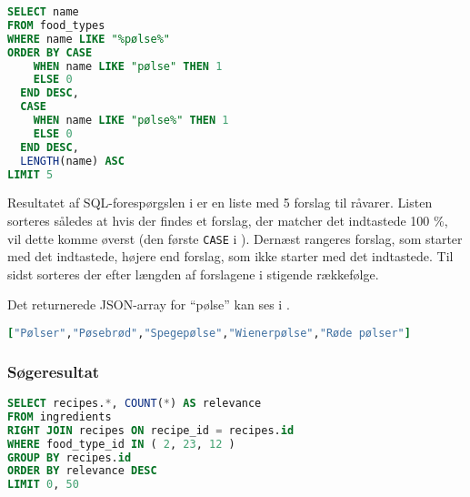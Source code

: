 \begin{lstlisting}[caption={Hvis en bruger indtaster ``pølse'' udføres denne SQL-forespørgsel.},label=lst:soegeforslag-sql,language=SQL]
SELECT name
FROM food_types
WHERE name LIKE "%pølse%"
ORDER BY CASE
    WHEN name LIKE "pølse" THEN 1
    ELSE 0
  END DESC,
  CASE
    WHEN name LIKE "pølse%" THEN 1
    ELSE 0
  END DESC,
  LENGTH(name) ASC
LIMIT 5
\end{lstlisting}

Resultatet af SQL-forespørgslen i  er en liste med 5 forslag til råvarer. Listen sorteres således at hvis der findes et forslag, der matcher det indtastede 100 \%, vil dette komme øverst (den første \texttt{CASE} i ). Dernæst rangeres forslag, som starter med det indtastede, højere end forslag, som ikke starter med det indtastede. Til sidst sorteres der efter længden af forslagene i stigende rækkefølge.

Det returnerede JSON-array for ``pølse'' kan ses i .

\begin{lstlisting}[caption={Et returneret JSON-array for ``pølse''.},label=lst:poelse-json,language=Ruby]
["Pølser","Pøsebrød","Spegepølse","Wienerpølse","Røde pølser"]
\end{lstlisting}

\subsubsection{Søgeresultat}
\begin{lstlisting}[caption={SQL query.},label=lst:soegeforslag-sql,language=SQL]
SELECT recipes.*, COUNT(*) AS relevance
FROM ingredients
RIGHT JOIN recipes ON recipe_id = recipes.id
WHERE food_type_id IN ( 2, 23, 12 )
GROUP BY recipes.id
ORDER BY relevance DESC
LIMIT 0, 50
\end{lstlisting}

